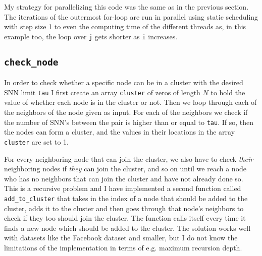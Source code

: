 \documentclass[reprint, english,notitlepage,nofootinbib]{revtex4-1}  %
\begin{document}
My strategy for parallelizing this code was the same as in the previous section. The iterations of the outermost for-loop are run in parallel using static scheduling with step size 1 to even the computing time of the different threads as, in this example too, the loop over \verb|j| gets shorter as \verb|i| increases.


\subsection{\texttt{check\_node}}

In order to check whether a specific node can be in a cluster with the desired SNN limit \verb|tau| I first create an array \verb|cluster| of zeros of length \(N\) to hold the value of whether each node is in the cluster or not. Then we loop through each of the neighbors of the node given as input. For each of the neighbors we check if the number of SNN's between the pair is higher than or equal to \verb|tau|. If so, then the nodes can form a cluster, and the values in their locations in the array \verb|cluster| are set to 1.

For every neighboring node that can join the cluster, we also have to check \textit{their} neighboring nodes if \textit{they} can join the cluster, and so on until we reach a node who has no neighbors that can join the cluster and have not already done so. This is a recursive problem and I have implemented a second function called \verb|add_to_cluster| that takes in the index of a node that should be added to the cluster, adds it to the cluster and then goes through that node's neighbors to check if they too should join the cluster. The function calls itself every time it finds a new node which should be added to the cluster. The solution works well with datasets like the Facebook dataset and smaller, but I do not know the limitations of the implementation in terms of e.g. maximum recursion depth.



\onecolumngrid
\vspace{1cm} %
\newpage

% 
\end{document}
